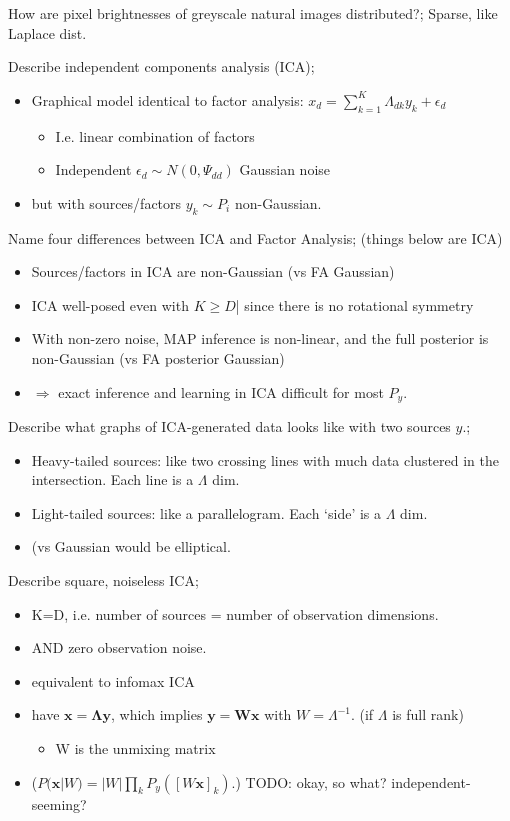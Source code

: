 \documentclass{article}
\begin{document}
How are pixel brightnesses of greyscale natural images distributed?; Sparse, like Laplace dist.

Describe independent components analysis (ICA); \begin{itemize} \item Graphical model identical to factor analysis: $x_d=\sum_{k=1}^K\Lambda_{dk}y_k+\epsilon_d$ \begin{itemize} \item I.e. linear combination of factors \item Independent $\epsilon_d\sim N(0, \Psi_{dd})$ Gaussian noise \end{itemize} \item but with sources/factors $y_k\sim P_i$ non-Gaussian. \end{itemize}

Name four differences between ICA and Factor Analysis; (things below are ICA) \begin{itemize} \item Sources/factors in ICA are non-Gaussian (vs FA Gaussian) \item ICA well-posed even with $K\geq D$| since there is no rotational symmetry \item With non-zero noise, MAP inference is non-linear, and the full posterior is non-Gaussian (vs FA posterior Gaussian) \item $\Rightarrow$ exact inference and learning in ICA difficult for most $P_y$. \end{itemize}

Describe what graphs of ICA-generated data looks like with two sources $y$.; \begin{itemize} \item Heavy-tailed sources: like two crossing lines with much data clustered in the intersection. Each line is a $\Lambda$ dim. \item Light-tailed sources: like a parallelogram. Each `side' is a $\Lambda$ dim. \item (vs Gaussian would be elliptical. \end{itemize}

Describe square, noiseless ICA; \begin{itemize} \item K=D, i.e. number of sources = number of observation dimensions. \item AND zero observation noise. \item equivalent to infomax ICA \item have $\mathbf{x=\Lambda y}$, which implies $\mathbf{y=Wx}$ with $W=\Lambda^{-1}$. (if $\Lambda$ is full rank) \begin{itemize} \item W is the unmixing matrix \end{itemize} \item ($P(\mathbf{x}|W)=|W|\prod_kP_y([W\mathbf{x}]_k)$.) TODO: okay, so what? independent-seeming? \end{itemize}
\end{document}
